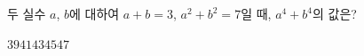 두 실수 $a$, $b$에 대하여 $a+b=3$, $a^2+b^2=7$일 때, $a^4+b^4$의 값은?
\begin{choices32}{$39$}{$41$}{$43$}{$45$}{$47$}\end{choices32}
